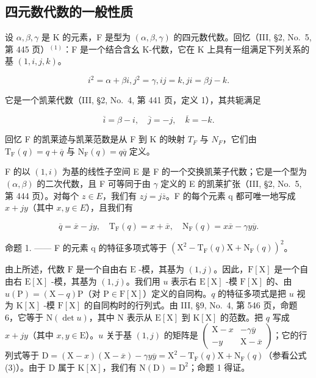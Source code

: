 \subsection{四元数代数的一般性质}

设 \(\alpha, \beta, \gamma\) 是 K 的元素，F 是型为 \((\alpha, \beta, \gamma)\) 的四元数代数。回忆（III, §2, No.~5, 第 445 页）\(^{(1)}\)：F 是一个结合含幺 K-代数，它在 K 上具有一组满足下列关系的基 \((1, i, j, k)\)。

\[
i ^ {2} = \alpha + \beta i, j ^ {2} = \gamma , i j = k, j i = \beta j - k.\tag{1}
\]

它是一个凯莱代数（III, §2, No.~4, 第 441 页，定义 1），其共轭满足

\[
\overline {{i}} = \beta - i, \quad \overline {{j}} = - j, \quad \overline {{k}} = - k.\tag{2}
\]

回忆 F 的凯莱迹与凯莱范数是从 F 到 K 的映射 \(T_{F}\) 与 \(N_{F}\)，它们由 \(\mathrm{T}_{\mathrm{F}}(q)=q+\overline{q}\) 与 \(\mathrm{N}_{\mathrm{F}}(q)=q\overline{q}\) 定义。

F 的以 \((1,i)\) 为基的线性子空间 E 是 F 的一个交换凯莱子代数；它是一个型为 \((\alpha,\beta)\) 的二次代数，且 F 可等同于由 \(\gamma\) 定义的 E 的凯莱扩张（III, §2, No.~5, 第 444 页）。对每个 \(z\in E\)，我们有 \(zj=j\overline{z}\)。F 的每个元素 q 都可唯一地写成 \(x+jy\)（其中 \(x,y\in E\)），且我们有

\[
\overline {{q}} = \overline {{x}} - j y, \quad \mathrm{T} _ {\mathrm{F}} (q) = x + \overline {{x}}, \quad \mathrm{N} _ {\mathrm{F}} (q) = x \overline {{x}} - \gamma y \overline {{y}}.\tag{3}
\]

命题 1. —— F 的元素 q 的特征多项式等于 \(\left(\mathrm{X}^{2}-\mathrm{T}_{\mathrm{F}}(q)\mathrm{X}+\mathrm{N}_{\mathrm{F}}(q)\right)^{2}\)。

由上所述，代数 \(\mathrm{F}\) 是一个自由右 \(\mathrm{E}\) -模，其基为 \((1,j)\)。因此，\(\mathrm{F}[\mathrm{X}]\) 是一个自由右 \(\mathrm{E}[\mathrm{X}]\) -模，其基为 \((1,j)\)。我们用 \(u\) 表示右 \(\mathrm{E}[\mathrm{X}]\) -模 \(\mathrm{F}[\mathrm{X}]\) 的、由 \(u(\mathrm{P}) = (\mathrm{X} - q)\mathrm{P}\)（对 \(\mathrm{P} \in \mathrm{F}[\mathrm{X}]\)）定义的自同构。\(q\) 的特征多项式是把 \(u\) 视为 \(\mathrm{K}[\mathrm{X}]\) -模 \(\mathrm{F}[\mathrm{X}]\) 的自同构时的行列式。由 III, §9, No.~4, 第 546 页，命题 6，它等于 \(\mathrm{N}(\det u)\)，其中 \(\mathrm{N}\) 表示从 \(\mathrm{E}[\mathrm{X}]\) 到 \(\mathrm{K}[\mathrm{X}]\) 的范数。把 \(q\) 写成 \(x + jy\)（其中 \(x, y \in \mathrm{E}\)）。\(u\) 关于基 \((1,j)\) 的矩阵是 \(\begin{pmatrix} \mathrm{X} - x & -\gamma \overline{y} \\ -y & \mathrm{X} - \overline{x} \end{pmatrix}\)；它的行列式等于 \(\mathrm{D} = (\mathrm{X} - x)(\mathrm{X} - \overline{x}) - \gamma y\overline{y} = \mathrm{X}^2 - \mathrm{T}_{\mathrm{F}}(q)\mathrm{X} + \mathrm{N}_{\mathrm{F}}(q)\)（参看公式 (3)）。由于 \(\mathrm{D}\) 属于 \(\mathrm{K}[\mathrm{X}]\)，我们有 \(\mathrm{N}(\mathrm{D}) = \mathrm{D}^2\)；命题 1 得证。

